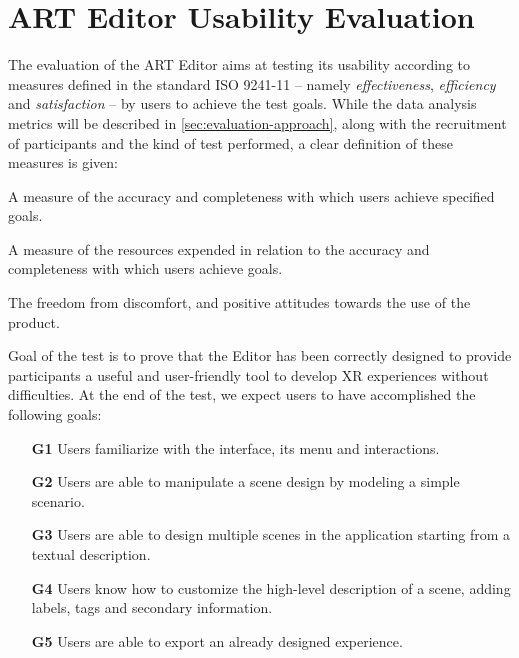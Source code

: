 \chapter{ART Editor Usability Evaluation}
\label{ch:evaluation}

The evaluation of the ART Editor aims at testing its usability according to measures defined in the standard ISO 9241-11 \cite{iso20189241} -- namely \emph{effectiveness}, \emph{efficiency} and \emph{satisfaction} -- by users to achieve the test goals. While the data analysis metrics will be described in \autoref{sec:evaluation-approach}, along with the recruitment of participants and the kind of test performed, a clear definition of these measures is given:
\begin{definition}[Effectiveness]
\label{def:effectiveness}
A measure of the accuracy and completeness with which users achieve specified goals.
\end{definition}

\begin{definition}[Efficiency]
A measure of the resources expended in relation to the accuracy and completeness with which users achieve goals.
\end{definition}

\begin{definition}[Satisfaction]
The freedom from discomfort, and positive attitudes towards the use of the product.
\end{definition}

Goal of the test is to prove that the Editor has been correctly designed to provide participants a useful and user-friendly tool to develop \gls{XR} experiences without difficulties. At the end of the test, we expect users to have accomplished the following goals:
\begin{itemize}
    \item[\textbf{G1}] Users familiarize with the interface, its menu and interactions.
    \item[\textbf{G2}] Users are able to manipulate a scene design by modeling a simple scenario.
    \item[\textbf{G3}] Users are able to design multiple scenes in the application starting from a textual description.
    \item[\textbf{G4}] Users know how to customize the high-level description of a scene, adding labels, tags and secondary information.
    \item[\textbf{G5}] Users are able to export an already designed experience.
\end{itemize}

